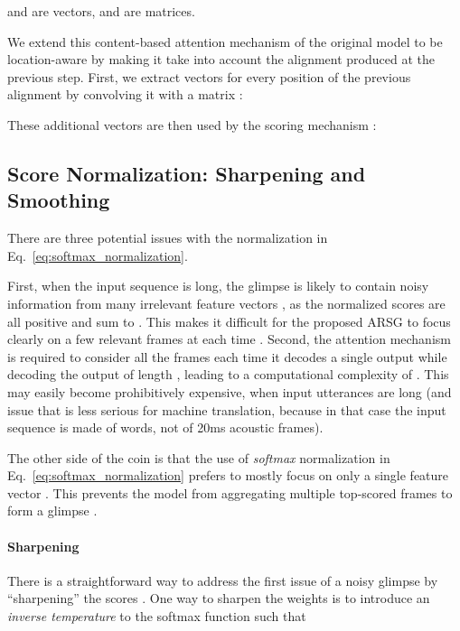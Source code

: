 \documentclass{article}
\begin{document}
 and  are vectors,  and  are matrices. 





We extend this content-based attention mechanism of the original model to be
location-aware by making it take into account the alignment produced at the
previous step. First, we extract  vectors  for
every position  of the previous alignment   by convolving it
with a matrix :

These additional vectors  are then used by the scoring mechanism :








\subsection{Score Normalization: Sharpening and Smoothing}
\label{sec:sharpening}

There are three potential issues with the normalization in
Eq.~\eqref{eq:softmax_normalization}. 

First, when the input sequence  is long, the glimpse  is likely to
contain noisy information from many irrelevant feature vectors , as the
normalized scores  are all positive and sum to . This makes it
difficult for the proposed ARSG to focus clearly on a few relevant frames at
each time . Second, the attention mechanism is required to consider all the
 frames each time it decodes a single output  while decoding the output
of length , leading to a computational complexity of . This may
easily become prohibitively expensive, when input utterances are long
(and issue that is less serious for machine translation, because in that
case the input sequence is made of words, not of 20ms acoustic frames).

The other side of the coin is that the use of {\it softmax} normalization in
Eq.~\eqref{eq:softmax_normalization} prefers to mostly focus on only a single
feature vector . This prevents the model from aggregating multiple
top-scored frames to form a glimpse .  

\paragraph{Sharpening}

There is a straightforward way to address the first issue of a noisy glimpse by
``sharpening'' the scores . One way to sharpen the weights is to
introduce an {\it inverse temperature}  to the softmax function such
that
\end{document}
